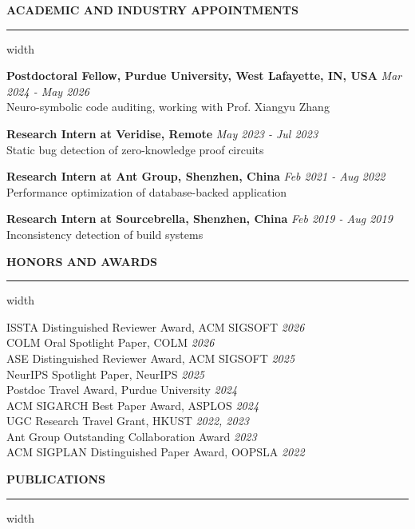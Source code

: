 \documentclass[centered]{resume}
\newlength{\cvsectiongap}
\newenvironment{rSection}[1]{%
  \par\Needspace{5\baselineskip}\addvspace{\cvsectiongap}
  {\bfseries \MakeUppercase{#1}}\vspace{0.65em}%
  \noindent\hrule width \linewidth\vspace{-0.45em}\par
}{\par}
\begin{document}
\begin{resume}
\begin{rSection}{ACADEMIC AND INDUSTRY APPOINTMENTS}
\textbf{Postdoctoral Fellow, Purdue University, West Lafayette, IN, USA} \hfill {\em Mar 2024 - May 2026}
\\ Neuro-symbolic code auditing, working with Prof. Xiangyu Zhang
\vspace{-2mm}

\textbf{Research Intern at Veridise, Remote} \hfill {\em May 2023 - Jul 2023}
\\ Static bug detection of zero-knowledge proof circuits
\vspace{-2mm}

\textbf{Research Intern at Ant Group, Shenzhen, China} \hfill {\em Feb 2021 - Aug 2022}
\\ Performance optimization of database-backed application
\vspace{-2mm}

\textbf{Research Intern at Sourcebrella, Shenzhen, China} \hfill {\em Feb 2019 - Aug 2019}
\\ Inconsistency detection of build systems
\end{rSection}

\begin{rSection}{Honors and Awards}
{ISSTA Distinguished Reviewer Award, ACM SIGSOFT} \hfill {\em 2026}\\
{COLM Oral Spotlight Paper, COLM} \hfill {\em 2026}\\
{ASE Distinguished Reviewer Award, ACM SIGSOFT} \hfill {\em 2025}\\
{NeurIPS Spotlight Paper, NeurIPS} \hfill {\em 2025}\\
{Postdoc Travel Award, Purdue University} \hfill {\em 2024}\\
{ACM SIGARCH Best Paper Award, ASPLOS} \hfill {\em 2024} \\
{UGC Research Travel Grant, HKUST} \hfill {\em 2022, 2023}\\
{Ant Group Outstanding Collaboration Award} \hfill {\em 2023}\\
{ACM SIGPLAN Distinguished Paper Award, OOPSLA} \hfill {\em 2022} \\
\end{rSection}

\vspace{-4mm}

\begin{rSection}{Publications}

\setlength{\parskip}{0.6\baselineskip}
\vspace{0.4\baselineskip}


\end{rSection}
\end{resume}
\end{document}
